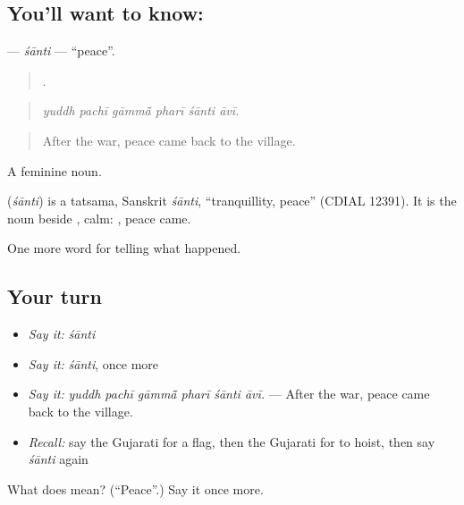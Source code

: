 \subsection*{You'll want to know: }
\textbf{} — \emph{śānti} — \textquotedblleft{}peace\textquotedblright{}.

\begin{quote}
     .
\end{quote}

\begin{quote}
\emph{yuddh pachī gāmmā̃ pharī śānti āvī.}
\end{quote}

\begin{quote}
After the war, peace came back to the village.
\end{quote}

A feminine noun.

\begin{cousinweb}
\textbf{} (\emph{śānti}) is a tatsama, Sanskrit \emph{śānti}, \textquotedblleft{}tranquillity, peace\textquotedblright{} (CDIAL 12391). It is the noun beside \textbf{}, calm: \textbf{ }, peace came.
\end{cousinweb}

\begin{grammarlens}[title={What you've built}]
One more word for telling what happened.
\end{grammarlens}

\subsection*{Your turn}
\begin{itemize}
\raggedright
  \item \emph{Say it:} \emph{śānti}
  \item \emph{Say it:} \emph{śānti}, once more
  \item \emph{Say it:} \emph{yuddh pachī gāmmā̃ pharī śānti āvī.} — After the war, peace came back to the village.
  \item \emph{Recall:} say the Gujarati for a flag, then the Gujarati for to hoist, then say \emph{śānti} again
\end{itemize}

\begin{tcolorbox}[breakable,colback=teal!4,colframe=teal!35!black,title={Before you move on}]
What does  mean? (\textquotedblleft{}Peace\textquotedblright{}.) Say it once more.
\end{tcolorbox}
